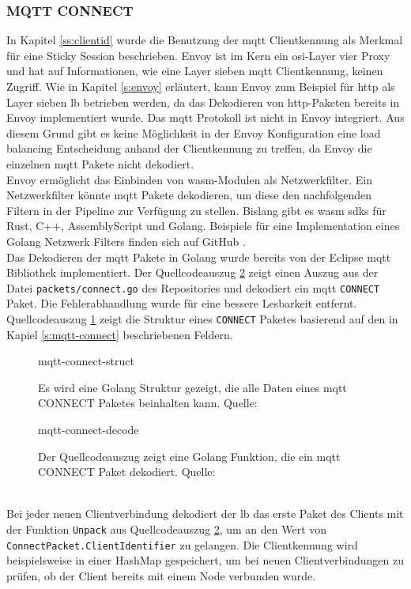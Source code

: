 \subsubsection{MQTT CONNECT}
In Kapitel \ref{ss:clientid} wurde die Benutzung der \ac{mqtt} Clientkennung als Merkmal für eine Sticky Session beschrieben. Envoy ist im Kern ein \ac{osi}-Layer vier Proxy und hat auf Informationen, wie eine Layer sieben \ac{mqtt} Clientkennung, keinen Zugriff. Wie in Kapitel \ref{s:envoy} erläutert, kann Envoy zum Beispiel für \ac{http} als Layer sieben \ac{lb} betrieben werden, da das Dekodieren von \ac{http}-Paketen bereits in Envoy implementiert wurde.
Das \ac{mqtt} Protokoll ist nicht in Envoy integriert. Aus diesem Grund gibt es keine Möglichkeit in der Envoy Konfiguration eine load balancing Entscheidung anhand der Clientkennung zu treffen, da Envoy die einzelnen \ac{mqtt} Pakete nicht dekodiert.
\\
Envoy ermöglicht das Einbinden von \acl{wasm}-Modulen als Netzwerkfilter.
Ein Netzwerkfilter könnte \ac{mqtt} Pakete dekodieren, um diese den nachfolgenden Filtern in der Pipeline zur Verfügung zu stellen.
Bislang gibt es \ac{wasm} \acp{sdk} für Rust, C++, AssemblyScript und Golang. \cite{sebastianHowWriteWASM} Beispiele für eine Implementation eines Golang Netzwerk Filters finden sich auf GitHub \cite{TetratelabsProxywasmgosdk2021}.
\\
Das Dekodieren der \ac{mqtt} Pakete in Golang wurde bereits von der Eclipse \ac{mqtt} Bibliothek \cite{EclipsePahoMqtt2021} implementiert.
Der Quellcodeauszug \ref{code:mqtt-connect-decode} zeigt einen Auszug aus der Datei \verb|packets/connect.go| des Repositories und dekodiert ein \ac{mqtt} \verb|CONNECT| Paket. Die Fehlerabhandlung wurde für eine bessere Lesbarkeit entfernt. Quellcodeauszug \ref{code:mqtt-connect-struct} zeigt die Struktur eines \verb|CONNECT| Paketes basierend auf den in Kapiel \ref{s:mqtt-connect} beschriebenen Feldern.
\begin{figure}[h]
    {mqtt-connect-struct}
    \caption{Es wird eine Golang Struktur gezeigt, die alle Daten eines \ac{mqtt} CONNECT Paketes beinhalten kann. Quelle: \cite{EclipsePahoMqtt2021}}
    \label{code:mqtt-connect-struct}
\end{figure}
\begin{figure}[h]
    {mqtt-connect-decode}
    \caption{Der Quellcodeauszug zeigt eine Golang Funktion, die ein \ac{mqtt} CONNECT Paket dekodiert. Quelle: \cite{EclipsePahoMqtt2021}}
    \label{code:mqtt-connect-decode}
\end{figure}
\\
Bei jeder neuen Clientverbindung dekodiert der \acl{lb} das erste Paket des Clients mit der Funktion \verb|Unpack| aus Quellcodeauszug \ref{code:mqtt-connect-decode}, um an den Wert von\newline
\verb|ConnectPacket.ClientIdentifier| zu gelangen.
Die Clientkennung wird beispielsweise in einer HashMap gespeichert, um bei neuen Clientverbindungen zu prüfen, ob der Client bereits mit einem Node verbunden wurde.

